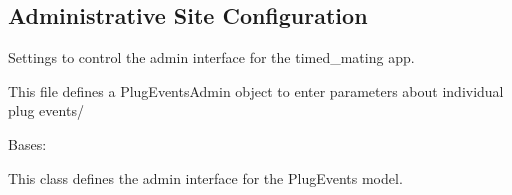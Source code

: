 \documentclass[letterpaper,10pt,english]{sphinxmanual}
\begin{document}
\begin{fulllineitems}
\label{api:timed_mating.urls.delete_plugevents}
\end{fulllineitems}


\begin{fulllineitems}
\label{api:timed_mating.urls.limited_object_detail}
\end{fulllineitems}


\begin{fulllineitems}
\label{api:timed_mating.urls.limited_object_list}
\end{fulllineitems}



\subsection{Administrative Site Configuration}
\label{api:id9}\label{api:module-timed_mating.admin}
Settings to control the admin interface for the timed\_mating app.


This file defines a PlugEventsAdmin object to enter parameters about individual plug events/


\begin{fulllineitems}
\label{api:timed_mating.admin.PlugEventsAdmin}
Bases: 


This class defines the admin interface for the PlugEvents model.


\begin{fulllineitems}
\label{api:timed_mating.admin.PlugEventsAdmin.media}
\end{fulllineitems}


\end{fulllineitems}
\end{document}
